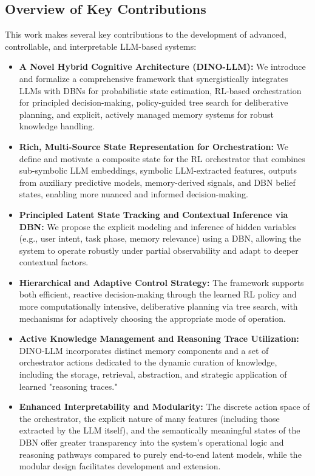 \documentclass[11pt]{article}
\begin{document}
\subsection{Overview of Key Contributions}
\label{sec:intro_contributions}
This work makes several key contributions to the development of advanced, controllable, and interpretable LLM-based systems:
\begin{itemize}
    \item \textbf{A Novel Hybrid Cognitive Architecture (DINO-LLM):} We introduce and formalize a comprehensive framework that synergistically integrates LLMs with DBNs for probabilistic state estimation, RL-based orchestration for principled decision-making, policy-guided tree search for deliberative planning, and explicit, actively managed memory systems for robust knowledge handling.
    \item \textbf{Rich, Multi-Source State Representation for Orchestration:} We define and motivate a composite state for the RL orchestrator that combines sub-symbolic LLM embeddings, symbolic LLM-extracted features, outputs from auxiliary predictive models, memory-derived signals, and DBN belief states, enabling more nuanced and informed decision-making.
    \item \textbf{Principled Latent State Tracking and Contextual Inference via DBN:} We propose the explicit modeling and inference of hidden variables (e.g., user intent, task phase, memory relevance) using a DBN, allowing the system to operate robustly under partial observability and adapt to deeper contextual factors.
    \item \textbf{Hierarchical and Adaptive Control Strategy:} The framework supports both efficient, reactive decision-making through the learned RL policy and more computationally intensive, deliberative planning via tree search, with mechanisms for adaptively choosing the appropriate mode of operation.
    \item \textbf{Active Knowledge Management and Reasoning Trace Utilization:} DINO-LLM incorporates distinct memory components and a set of orchestrator actions dedicated to the dynamic curation of knowledge, including the storage, retrieval, abstraction, and strategic application of learned "reasoning traces."
    \item \textbf{Enhanced Interpretability and Modularity:} The discrete action space of the orchestrator, the explicit nature of many features (including those extracted by the LLM itself), and the semantically meaningful states of the DBN offer greater transparency into the system's operational logic and reasoning pathways compared to purely end-to-end latent models, while the modular design facilitates development and extension.
\end{itemize}
\end{document}
